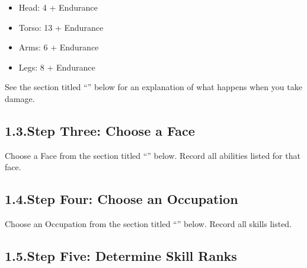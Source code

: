 \documentclass{article}
\begin{document}
\begin{itemize}[noitemsep,topsep=\mdcompacttopsep]%

\item{}Head:  4 + Endurance%

\item{}Torso: 13 + Endurance%

\item{}Arms:  6 + Endurance%

\item{}Legs:  8 + Endurance %
\end{itemize}%

\noindent{}See the section titled “” below for an explanation of what happens when you take damage.%

\subsection{1.3.\hspace*{0.5em}Step Three: Choose a Face}\label{sec-step-three--choose-a-face}%

\noindent{}Choose a Face from the section titled “” below. Record all abilities listed for that face.%

\subsection{1.4.\hspace*{0.5em}Step Four: Choose an Occupation}\label{sec-step-four--choose-an-occupation}%

\noindent{}Choose an Occupation from the section titled “” below. Record all skills listed.%

\subsection{1.5.\hspace*{0.5em}Step Five: Determine Skill Ranks}\label{sec-step-five--determine-skill-ranks}%
\end{document}
